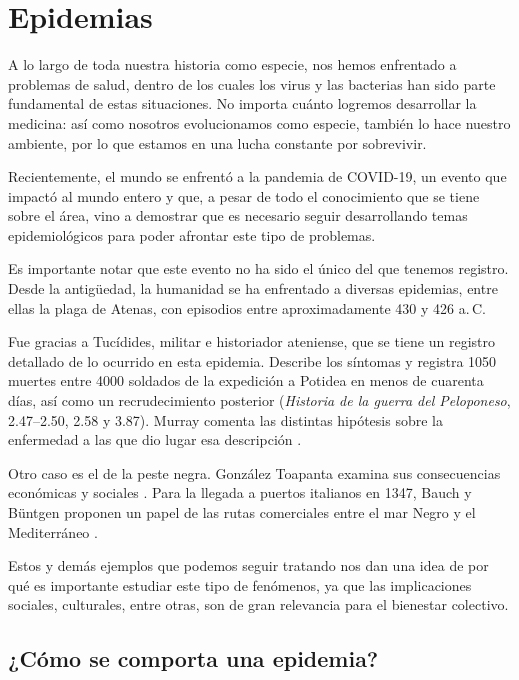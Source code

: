 \chapter{Epidemias}


A lo largo de toda nuestra historia como especie, nos hemos enfrentado a problemas de salud, dentro de los cuales los virus y las bacterias han sido parte fundamental de estas situaciones. No importa cuánto logremos desarrollar la medicina: así como nosotros evolucionamos como especie, también lo hace nuestro ambiente, por lo que estamos en una lucha constante por sobrevivir.

Recientemente, el mundo se enfrentó a la pandemia de COVID-19, un evento que impactó al mundo entero y que, a pesar de todo el conocimiento que se tiene sobre el área, vino a demostrar que es necesario seguir desarrollando temas epidemiológicos para poder afrontar este tipo de problemas.

Es importante notar que este evento no ha sido el único del que tenemos registro. Desde la antigüedad, la humanidad se ha enfrentado a diversas epidemias, entre ellas la plaga de Atenas, con episodios entre aproximadamente 430 y 426 a.\,C.


Fue gracias a Tucídides, militar e historiador ateniense, que se tiene un registro detallado de lo ocurrido en esta epidemia. Describe los síntomas y registra 1050 muertes entre 4000 soldados de la expedición a Potidea en menos de cuarenta días, así como un recrudecimiento posterior (\emph{Historia de la guerra del Peloponeso}, 2.47--2.50, 2.58 y 3.87). Murray comenta las distintas hipótesis sobre la enfermedad a las que dio lugar esa descripción \cite{murray1989}.

Otro caso es el de la peste negra. González Toapanta examina sus consecuencias económicas y sociales \cite[p.~134]{german2021}. Para la llegada a puertos italianos en 1347, Bauch y Büntgen proponen un papel de las rutas comerciales entre el mar Negro y el Mediterráneo \cite{bauch2025}.

Estos y demás ejemplos que podemos seguir tratando nos dan una idea de por qué es importante estudiar este tipo de fenómenos, ya que las implicaciones sociales, culturales, entre otras, son de gran relevancia para el bienestar colectivo.

\section{¿Cómo se comporta una epidemia?}

